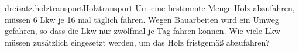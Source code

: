 \begin{exercise}{dreisatz.holztransport}{Holztransport}
  \ifproblem\problem
    Um eine bestimmte Menge Holz abzufahren, müssen 6 Lkw je 16 mal täglich fahren.
    Wegen Bauarbeiten wird ein Umweg gefahren, so dass die Lkw nur zwölfmal je Tag
    fahren können. Wie viele Lkw müssen zusätzlich eingesetzt werden, um das
    Holz fristgemäß abzufahren?
  \fi
\end{exercise}
